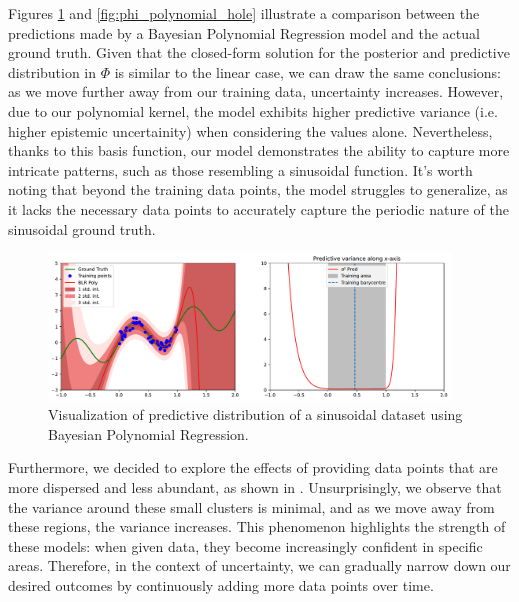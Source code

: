 Figures \ref{fig:phi_polynomial} and \ref{fig:phi_polynomial_hole} illustrate a comparison between the predictions made by a Bayesian Polynomial Regression model and the actual ground truth. Given that the closed-form solution for the posterior and predictive distribution in $\Phi$ is similar to the linear case, we can draw the same conclusions: as we move further away from our training data, uncertainty increases. However, due to our polynomial kernel, the model exhibits higher predictive variance (i.e. higher epistemic uncertainity) when considering the values alone. Nevertheless, thanks to this basis function, our model demonstrates the ability to capture more intricate patterns, such as those resembling a sinusoidal function. It's worth noting that beyond the training data points, the model struggles to generalize, as it lacks the necessary data points to accurately capture the periodic nature of the sinusoidal ground truth. %

\begin{figure}[H]
    \centering
    \includegraphics[width=0.95\textwidth]{phi_polynomial.pdf}
    \caption{Visualization of predictive distribution of a sinusoidal dataset using Bayesian Polynomial Regression.}
    \label{fig:phi_polynomial}
\end{figure}

Furthermore, we decided to explore the effects of providing data points that are more dispersed and less abundant, as shown in . Unsurprisingly, we observe that the variance around these small clusters is minimal, and as we move away from these regions, the variance increases. This phenomenon highlights the strength of these models: when given data, they become increasingly confident in specific areas. Therefore, in the context of uncertainty, we can gradually narrow down our desired outcomes by continuously adding more data points over time.

